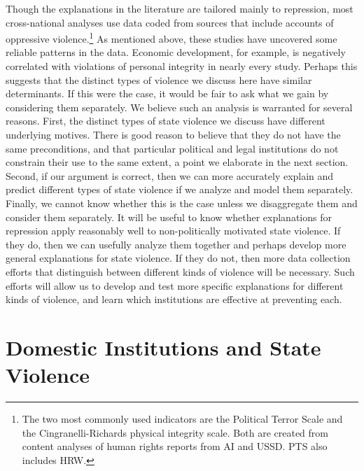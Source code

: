 \documentclass[12pt]{article}
\begin{document}
Though the explanations in the literature are tailored mainly to repression, most cross-national analyses use data coded from sources that include accounts of oppressive violence.\footnote{The two most commonly used indicators are the Political Terror Scale and the Cingranelli-Richards physical integrity scale. Both are created from content analyses of human rights reports from AI and USSD. PTS also includes HRW.} As mentioned above, these studies have uncovered some reliable patterns in the data. Economic development, for example, is negatively correlated with violations of personal integrity in nearly every study. Perhaps this suggests that the distinct types of violence we discuss here have similar determinants. If this were the case, it would be fair to ask what we gain by considering them separately. We believe such an analysis is warranted for several reasons. First, the distinct types of state violence we discuss have different underlying motives. There is good reason to believe that they do not have the same preconditions, and that particular political and legal institutions do not constrain their use to the same extent, a point we elaborate in the next section. Second, if our argument is correct, then we can more accurately explain and predict different types of state violence if we analyze and model them separately. Finally, we cannot know whether this is the case unless we disaggregate them and consider them separately. It will be useful to know whether explanations for repression apply reasonably well to non-politically motivated state violence. If they do, then we can usefully analyze them together and perhaps develop more general explanations for state violence. If they do not, then more data collection efforts that distinguish between different kinds of violence will be necessary. Such efforts will allow us to develop and test more specific explanations for different kinds of violence, and learn which institutions are effective at preventing each.     

\section*{Domestic Institutions and State Violence}
\end{document}
